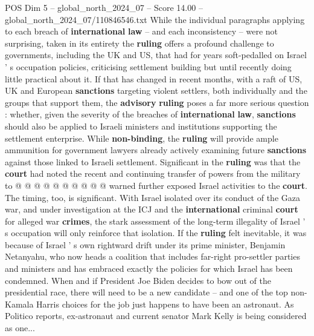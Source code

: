 \begin{textsample}{POS Dim 5 – global\_north\_2024\_07 – Score 14.00 – global\_north\_2024\_07/110846546.txt}
While the individual paragraphs applying to each breach of \textbf{international} \textbf{law} -- and each inconsistency -- were not surprising, taken in its entirety the \textbf{ruling} offers a profound challenge to governments, including the UK and US, that had for years soft-pedalled on Israel ' s occupation policies, criticising settlement building but until recently doing little practical about it.
If that has changed in recent months, with a raft of US, UK and European \textbf{sanctions} targeting violent settlers, both individually and the groups that support them, the \textbf{advisory} \textbf{ruling} poses a far more serious question : whether, given the severity of the breaches of \textbf{international} \textbf{law}, \textbf{sanctions} should also be applied to Israeli ministers and institutions supporting the settlement enterprise.
While \textbf{non-binding}, the \textbf{ruling} will provide ample ammunition for government lawyers already actively examining future \textbf{sanctions} against those linked to Israeli settlement.
Significant in the \textbf{ruling} was that the \textbf{court} had noted the recent and continuing transfer of powers from the military to @ @ @ @ @ @ @ @ @ @ warned further exposed Israel activities to the \textbf{court}.
The timing, too, is significant.
With Israel isolated over its conduct of the Gaza war, and under investigation at the ICJ and the \textbf{international} criminal \textbf{court} for alleged war \textbf{crimes}, the stark assessment of the long-term illegality of Israel ' s occupation will only reinforce that isolation.
If the \textbf{ruling} felt inevitable, it was because of Israel ' s own rightward drift under its prime minister, Benjamin Netanyahu, who now heads a coalition that includes far-right pro-settler parties and ministers and has embraced exactly the policies for which Israel has been condemned.
When and if President Joe Biden decides to bow out of the presidential race, there will need to be a new candidate -- and one of the top non-Kamala Harris choices for the job just happens to have been an astronaut.
As Politico reports, ex-astronaut and current senator Mark Kelly is being considered as one...

\end{textsample}
